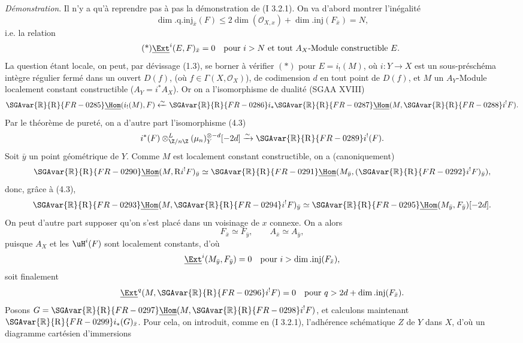 \emph{Démonstration}. Il n'y a qu'à reprendre pas à pas la démonstration de (I 3.2.1). On va d'abord montrer l'inégalité
\[
        \dim.\mathrm{q.inj}_{\bar{x}}(F)\leq 2\dim(\mathcal{O}_{X,x})+\dim.\mathrm{inj}(F_{\bar{x}})=N,
\]
i.e. la relation
\begin{equation}\tag{*}
        \underline{\Ext}^{i}(E,F)_{\bar{x}}=0\quad\hbox{pour } i>N\hbox{ et tout }A_X\hbox{-Module constructible }E.
\end{equation}
La question étant locale, on peut, par dévissage (1.3), se borner à vérifier $(*)$ pour $E=i_!(M)$, où $i:Y\to X$ est un sous-préschéma intègre régulier fermé dans un ouvert $D(f)$, (où $f\in\Gamma(X,\mathcal{O}_X)$), de codimension $d$ en tout point de $D(f)$, et $M$ un $A_Y$-Module localement constant constructible ($A_Y=i^*A_X$).
Or on a l'isomorphisme de dualité (SGAA XVIII)
\[
        \SGAvar{\mathbb{R}}{\mathrm{R}}{FR-0285}\underline{\Hom}(i_!(M),F)\xleftarrow{\sim} \SGAvar{\mathbb{R}}{\mathrm{R}}{FR-0286} i_*\SGAvar{\mathbb{R}}{\mathrm{R}}{FR-0287}\underline{\Hom}(M,\SGAvar{\mathbb{R}}{\mathrm{R}}{FR-0288} i^!F).
\]
Par le théorème de pureté, on a d'autre part l'isomorphisme (4.3)
\[
        i^*(F)\otimes^L_{\Z/n\Z}(\mu_n)_Y^{\otimes -d}[-2d]\xrightarrow{\sim}\SGAvar{\mathbb{R}}{\mathrm{R}}{FR-0289} i^!(F).
\]
Soit $\bar{y}$ un point géométrique de $Y$. Comme $M$ est localement constant constructible, on a (canoniquement)
\[
        \SGAvar{\mathbb{R}}{\mathrm{R}}{FR-0290}\underline{\Hom}(M,\mathrm{R} i^!F)_{\bar{y}}\simeq \SGAvar{\mathbb{R}}{\mathrm{R}}{FR-0291}\underline{\Hom}(M_{\bar{y}},(\SGAvar{\mathbb{R}}{\mathrm{R}}{FR-0292} i^!F)_{\bar{y}}),
\]
donc, grâce à (4.3),
\[
        \SGAvar{\mathbb{R}}{\mathrm{R}}{FR-0293}\underline{\Hom}(M,\SGAvar{\mathbb{R}}{\mathrm{R}}{FR-0294} i^!F)_{\bar{y}}\simeq \SGAvar{\mathbb{R}}{\mathrm{R}}{FR-0295}\underline{\Hom}(M_{\bar{y}},F_{\bar{y}})[-2d].
\]
On peut d'autre part supposer qu'on s'est placé dans un voisinage de $x$ connexe. On a alors
\[
        F_{\bar{x}}\simeq F_{\bar{y}},\qquad A_{\bar{x}}\simeq A_{\bar{y}},
\]
puisque $A_X$ et les $\uH^i(F)$ sont localement constants, d'où
\[
        \underline{\Ext}^i(M_{\bar{y}},F_{\bar{y}})=0\quad\hbox{pour }i>\dim.\mathrm{inj}(F_{\bar{x}}),
\]
soit finalement
\[
        \underline{\Ext}^{q}(M,\SGAvar{\mathbb{R}}{\mathrm{R}}{FR-0296} i^!F)=0\quad\hbox{pour }q>2d+\dim.\mathrm{inj}(F_{\bar{x}}).
\]
Posons $G=\SGAvar{\mathbb{R}}{\mathrm{R}}{FR-0297}\underline{\Hom}(M,\SGAvar{\mathbb{R}}{\mathrm{R}}{FR-0298} i^!F)$, et calculons maintenant $\SGAvar{\mathbb{R}}{\mathrm{R}}{FR-0299} i_*(G)_{\bar{x}}$. Pour cela, on introduit, comme en (I 3.2.1), l'adhérence schématique $Z$ de $Y$ dans $X$, d'où un diagramme cartésien d'immersions

